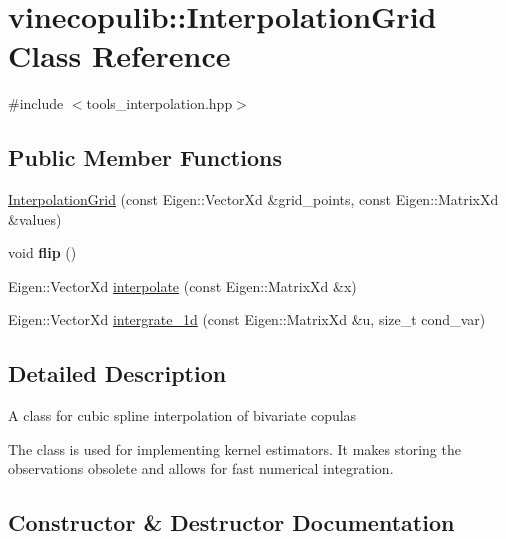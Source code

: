 \hypertarget{classvinecopulib_1_1_interpolation_grid}{}\section{vinecopulib\+:\+:Interpolation\+Grid Class Reference}
\label{classvinecopulib_1_1_interpolation_grid}


{\ttfamily \#include $<$tools\+\_\+interpolation.\+hpp$>$}

\subsection*{Public Member Functions}
\begin{DoxyCompactItemize}
\item 
\hyperlink{classvinecopulib_1_1_interpolation_grid_a9e63e4af3a252454eeae6df38fd8e0ca}{Interpolation\+Grid} (const Eigen\+::\+Vector\+Xd \&grid\+\_\+points, const Eigen\+::\+Matrix\+Xd \&values)
\item 
void {\bfseries flip} ()\hypertarget{classvinecopulib_1_1_interpolation_grid_a8dc18717a2e8dfe5b157571805a25dab}{}\label{classvinecopulib_1_1_interpolation_grid_a8dc18717a2e8dfe5b157571805a25dab}

\item 
Eigen\+::\+Vector\+Xd \hyperlink{classvinecopulib_1_1_interpolation_grid_a7fe207d7f864d2b05654c5efb5e27f35}{interpolate} (const Eigen\+::\+Matrix\+Xd \&x)
\item 
Eigen\+::\+Vector\+Xd \hyperlink{classvinecopulib_1_1_interpolation_grid_a96019d781b0f90de03f9d00bbd9d01e9}{intergrate\+\_\+1d} (const Eigen\+::\+Matrix\+Xd \&u, size\+\_\+t cond\+\_\+var)
\end{DoxyCompactItemize}


\subsection{Detailed Description}
A class for cubic spline interpolation of bivariate copulas

The class is used for implementing kernel estimators. It makes storing the observations obsolete and allows for fast numerical integration. 

\subsection{Constructor \& Destructor Documentation}
